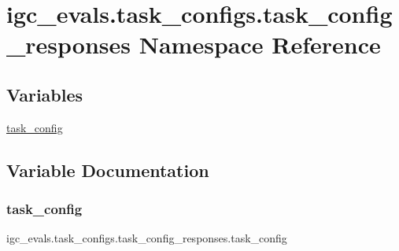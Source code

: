 \hypertarget{namespaceigc__evals_1_1task__configs_1_1task__config__responses}{}\section{igc\+\_\+evals.\+task\+\_\+configs.\+task\+\_\+config\+\_\+responses Namespace Reference}
\label{namespaceigc__evals_1_1task__configs_1_1task__config__responses}
\subsection*{Variables}
\begin{DoxyCompactItemize}
\item 
\hyperlink{namespaceigc__evals_1_1task__configs_1_1task__config__responses_ac0c50e1b1f864b396f86784880381ac8}{task\+\_\+config}
\end{DoxyCompactItemize}


\subsection{Variable Documentation}
\mbox{\label{namespaceigc__evals_1_1task__configs_1_1task__config__responses_ac0c50e1b1f864b396f86784880381ac8}} 
\subsubsection{\texorpdfstring{task\+\_\+config}{task\_config}}
{\footnotesize\ttfamily igc\+\_\+evals.\+task\+\_\+configs.\+task\+\_\+config\+\_\+responses.\+task\+\_\+config}

